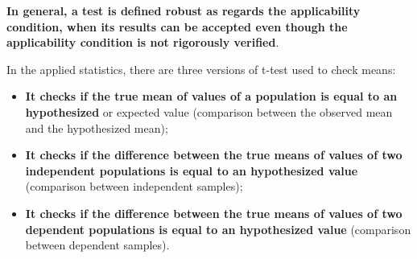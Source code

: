\begin{frame}
  \vspace*{2.5cm}
  \textbf{In general, a test is defined robust as regards the applicability condition, when its results can be accepted even though the applicability condition is not rigorously verified}.
\end{frame}

\begin{frame}
  \vspace*{.5cm}
  In the applied statistics, there are three versions of t-test used to check means:\\
  \vspace*{.25cm}
  \begin{itemize}
    \item \textbf{It checks if the true mean of values of a population is equal to an hypothesized} or expected value (comparison between the observed mean and the hypothesized mean);
    \vspace*{.5cm}
    \item \textbf{It checks if the difference between the true means of values of two independent populations is equal to an hypothesized value} (comparison between independent samples);
    \vspace*{.5cm}
    \item\textbf{It checks if the difference between the true means of values of two dependent populations is equal to an hypothesized value} (comparison between dependent samples).
  \end{itemize}
\end{frame}


